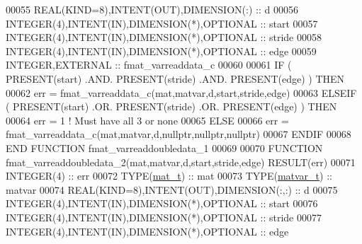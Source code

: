 \begin{DoxyCode}
00055     \textcolor{keywordtype}{REAL(KIND=8)},\textcolor{keywordtype}{INTENT(OUT)},\textcolor{keywordtype}{DIMENSION(:)}       :: d
00056     \textcolor{keywordtype}{INTEGER(4)},\textcolor{keywordtype}{INTENT(IN)},\textcolor{keywordtype}{DIMENSION(*)},\textcolor{keywordtype}{OPTIONAL} :: start
00057     \textcolor{keywordtype}{INTEGER(4)},\textcolor{keywordtype}{INTENT(IN)},\textcolor{keywordtype}{DIMENSION(*)},\textcolor{keywordtype}{OPTIONAL} :: stride
00058     \textcolor{keywordtype}{INTEGER(4)},\textcolor{keywordtype}{INTENT(IN)},\textcolor{keywordtype}{DIMENSION(*)},\textcolor{keywordtype}{OPTIONAL} :: edge
00059     \textcolor{keywordtype}{INTEGER},\textcolor{keywordtype}{EXTERNAL}                            :: fmat\_varreaddata\_c
00060 
00061     \textcolor{keywordflow}{IF} ( \textcolor{keyword}{PRESENT}(start) .AND. \textcolor{keyword}{PRESENT}(stride) .AND. \textcolor{keyword}{PRESENT}(edge) ) \textcolor{keywordflow}{THEN}
00062         err = fmat\_varreaddata\_c(mat,matvar,d,start,stride,edge)
00063     \textcolor{keywordflow}{ELSEIF} ( \textcolor{keyword}{PRESENT}(start) .OR. \textcolor{keyword}{PRESENT}(stride) .OR. \textcolor{keyword}{PRESENT}(edge) ) \textcolor{keywordflow}{THEN}
00064         err = 1    \textcolor{comment}{! Must have all 3 or none}
00065     \textcolor{keywordflow}{ELSE}
00066         err = fmat\_varreaddata\_c(mat,matvar,d,nullptr,nullptr,nullptr)
00067 \textcolor{keywordflow}{    ENDIF}
00068 \textcolor{keyword}{END FUNCTION }fmat\_varreaddoubledata\_1
00069 
00070 \textcolor{keyword}{FUNCTION }fmat\_varreaddoubledata\_2(mat,matvar,d,start,stride,edge) \textcolor{keyword}{RESULT}(err)
00071     \textcolor{keywordtype}{INTEGER(4)}                                  :: err
00072     \textcolor{keywordtype}{TYPE}(\hyperlink{group___m_a_t_gab0fc888f5a5d79943b16284b1f91c2e8}{mat\_t})                                 :: mat
00073     \textcolor{keywordtype}{TYPE}(\hyperlink{group___m_a_t_structmatvar__t}{matvar\_t})                              :: matvar
00074     \textcolor{keywordtype}{REAL(KIND=8)},\textcolor{keywordtype}{INTENT(OUT)},\textcolor{keywordtype}{DIMENSION(:,:)}     :: d
00075     \textcolor{keywordtype}{INTEGER(4)},\textcolor{keywordtype}{INTENT(IN)},\textcolor{keywordtype}{DIMENSION(*)},\textcolor{keywordtype}{OPTIONAL} :: start
00076     \textcolor{keywordtype}{INTEGER(4)},\textcolor{keywordtype}{INTENT(IN)},\textcolor{keywordtype}{DIMENSION(*)},\textcolor{keywordtype}{OPTIONAL} :: stride
00077     \textcolor{keywordtype}{INTEGER(4)},\textcolor{keywordtype}{INTENT(IN)},\textcolor{keywordtype}{DIMENSION(*)},\textcolor{keywordtype}{OPTIONAL} :: edge

\end{DoxyCode}
